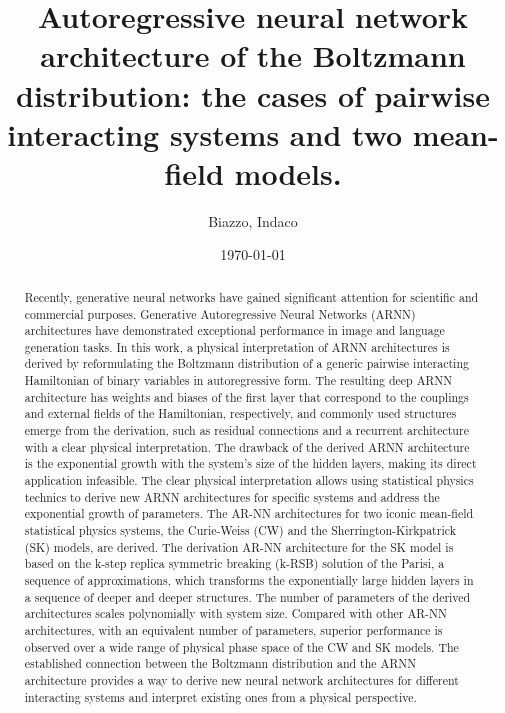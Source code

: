 \documentclass[aps,physrev,10pt,floatfix,reprint]{revtex4-2}
\begin{document}
\title{Autoregressive neural network architecture of the Boltzmann distribution: the cases of pairwise interacting systems and two mean-field models.}
\author{Biazzo, Indaco}
\date{\today}

\begin{abstract}
    Recently, generative neural networks have gained significant attention for scientific and commercial purposes. Generative Autoregressive Neural Networks (ARNN) architectures have demonstrated exceptional performance in image and language generation tasks. In this work, a physical interpretation of ARNN architectures is derived by reformulating the Boltzmann distribution of a generic pairwise interacting Hamiltonian of binary variables in autoregressive form. The resulting deep ARNN architecture has weights and biases of the first layer that correspond to the couplings and external fields of the Hamiltonian, respectively, and commonly used structures emerge from the derivation, such as residual connections and a recurrent architecture with a clear physical interpretation. The drawback of the derived ARNN architecture is the exponential growth with the system's size of the hidden layers, making its direct application infeasible. The clear physical interpretation allows using statistical physics technics to derive new ARNN architectures for specific systems and address the exponential growth of parameters. The AR-NN architectures for two iconic mean-field statistical physics systems, the Curie-Weiss (CW) and the Sherrington-Kirkpatrick (SK) models, are derived. The derivation AR-NN architecture for the SK model is based on the k-step replica symmetric breaking (k-RSB) solution of the Parisi, a sequence of approximations, which transforms the exponentially large hidden layers in a sequence of deeper and deeper structures. The number of parameters of the derived architectures scales polynomially with system size. Compared with other AR-NN architectures, with an equivalent number of parameters, superior performance is observed over a wide range of physical phase space of the CW and SK models. The established connection between the Boltzmann distribution and the ARNN architecture provides a way to derive new neural network architectures for different interacting systems and interpret existing ones from a physical perspective.
\end{abstract}
    
\end{document}

